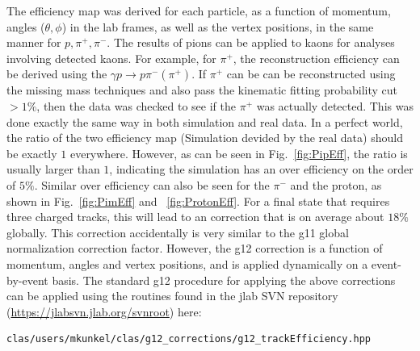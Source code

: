 \begin{v2}
The efficiency map was derived for each particle, as a function of momentum, angles ($\theta, \phi$) in the lab frames, as well as the vertex positions, in the same manner for $p, \pi^+, \pi^-$. The results of pions can be applied to kaons for analyses involving detected kaons. For example, for $\pi^+$, the reconstruction efficiency can be derived using the $ \gamma p \rightarrow p \pi^- (\pi^+)$. If $\pi^+$ can be can be reconstructed using the missing mass techniques and also pass the kinematic fitting probability cut $>1 \%$, then the data was checked to see if the $\pi^+$ was actually detected. This was done exactly the same way in both simulation and real data. In a perfect world, the ratio of the two efficiency map (Simulation devided by the real data) should be exactly $1$ everywhere. However, as can be seen in  Fig.~\ref{fig:PipEff}, the ratio is usually larger than $1$, indicating the simulation has an over efficiency on the order of $5 \%$. Similar over efficiency can also be seen for the $\pi^-$ and the proton, as shown in Fig.~\ref{fig:PimEff} and ~\ref{fig:ProtonEff}. For a final state that requires three charged tracks, this will lead to an correction that is on average about $18 \%$ globally. This correction accidentally is very similar to the g11 global normalization correction factor. However, the g12 correction is a function of momentum, angles and vertex positions, and is applied dynamically on a event-by-event basis. The standard g12 procedure for applying the above corrections can be applied using the routines found in the jlab SVN repository (\url{https://jlabsvn.jlab.org/svnroot}) here:
\begin{verbatim}
clas/users/mkunkel/clas/g12_corrections/g12_trackEfficiency.hpp
\end{verbatim}


\end{v2}

